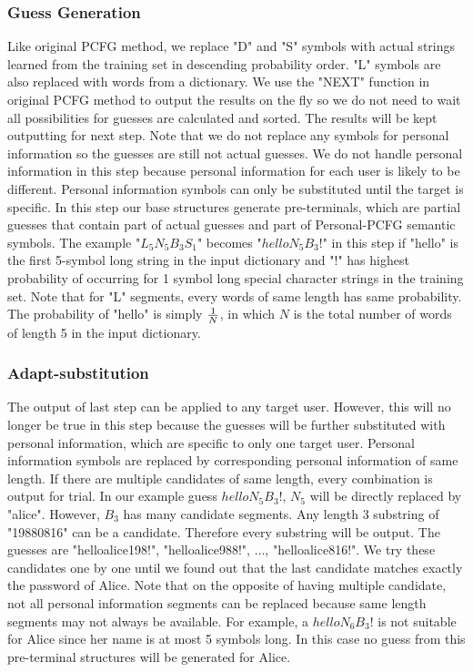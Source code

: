 \subsubsection{Guess Generation}
Like original PCFG method, we replace "D" and "S" symbols with actual strings learned from the training set in descending probability order. "L" symbols are also replaced with words from a dictionary. We use the "NEXT" function \cite{weir2009password} in original PCFG method to output the results on the fly so we do not need to wait all possibilities for guesses are calculated and sorted. The results will be kept outputting for next step. Note that we do not replace any symbols for personal information so the guesses are still not actual guesses. We do not handle personal information in this step because personal information for each user is likely to be different. Personal information symbols can only be substituted until the target is specific. In this step our base structures generate pre-terminals, which are partial guesses that contain part of actual guesses and part of Personal-PCFG semantic symbols. The example "$L_5N_5B_3S_1$" becomes "$helloN_5B_3!$" in this step if "hello" is the first 5-symbol long string in the input dictionary and "!" has highest probability of occurring for 1 symbol long special character strings in the training set. Note that for "L" segments, every words of same length has same probability. The probability of "hello" is simply $1\over N$, in which $N$ is the total number of words of length 5 in the input dictionary. 

\subsubsection{Adapt-substitution}
The output of last step can be applied to any target user. However, this will no longer be true in this step because the guesses will be further substituted with personal information, which are specific to only one target user. Personal information symbols are replaced by corresponding personal information of same length. If there are multiple candidates of same length, every combination is output for trial. In our example guess $helloN_5B_3!$, $N_5$ will be directly replaced by "alice". However, $B_3$ has many candidate segments. Any length 3 substring of "19880816" can be a candidate. Therefore every substring will be output. The guesses are "helloalice198!", "helloalice988!", $\ldots$, "helloalice816!". We try these candidates one by one until we found out that the last candidate matches exactly the password of Alice. Note that on the opposite of having multiple candidate, not all personal information segments can be replaced because same length segments may not always be available. For example, a $helloN_6B_3!$ is not suitable for Alice since her name is at most 5 symbols long. In this case no guess from this pre-terminal structures will be generated for Alice. 

